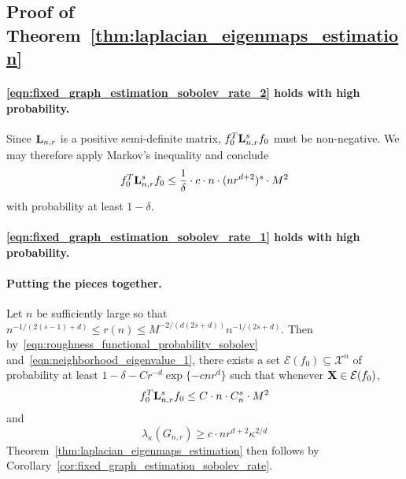 \documentclass{article}
\newcommand{\1}{\mathbf{1}}
\newcommand{\Lap}{{\bf L}}
\newcommand{\Xset}{\mathcal{X}}
\theoremstyle{alden}
\theoremstyle{aldenthm}
\theoremstyle{definition}
\theoremstyle{remark}
\begin{document}
\subsection{Proof of Theorem~\ref{thm:laplacian_eigenmaps_estimation}}
\label{subsec:laplacian_eigenmaps_estimation_pf}


\paragraph{\eqref{eqn:fixed_graph_estimation_sobolev_rate_2} holds with high probability.}

Since $\Lap_{n,r}$ is a positive semi-definite matrix, $f_0^T \Lap_{{n,r}}^s f_0$ must be non-negative. We may therefore apply Markov's inequality and conclude
\begin{equation}
\label{eqn:roughness_functional_probability_sobolev}
f_0^T \Lap_{{n,r}}^s f_0 \leq  \frac{1}{\delta} \cdot c \cdot n \cdot (nr^{d+2})^s \cdot M^2
\end{equation}
with probability at least $1 - \delta$.

\paragraph{\eqref{eqn:fixed_graph_estimation_sobolev_rate_1} holds with high probability.}

\paragraph{Putting the pieces together.}

Let $n$ be sufficiently large so that $n^{-1/(2(s - 1)+ d)} \leq r(n) \leq M^{-2/(d(2s + d))} n^{-1/(2s + d)}$. Then by~\eqref{eqn:roughness_functional_probability_sobolev} and~\eqref{eqn:neighborhood_eigenvalue_1}, there exists a set $\mathcal{E}(f_0) \subseteq \Xset^n$ of probability at least $1 - \delta - Cr^{-d}\exp\{-cnr^d\}$ such that whenever ${\bf X} \in \mathcal{E}(f_0)$,
\begin{equation*}
f_0^T \Lap_{n,r}^s f_0 \leq C \cdot n \cdot C_n^s \cdot M^2
\end{equation*}
and
\begin{equation*}
\lambda_{\kappa}(G_{n,r}) \geq c \cdot nr^{d+2}\kappa^{2/d}
\end{equation*}
Theorem~\ref{thm:laplacian_eigenmaps_estimation} then follows by Corollary~\ref{cor:fixed_graph_estimation_sobolev_rate}.
\end{document}
